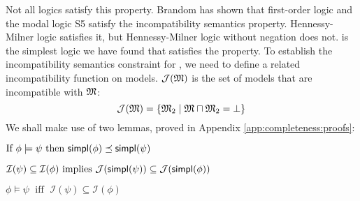 \NI Not all logics satisfy this property.  Brandom has shown that
first-order logic and the modal logic S5 satisfy the incompatibility
semantics property.
Hennessy-Milner logic satisfies it, but Hennessy-Milner logic without
negation does not.  \Cathoristic{} is the simplest logic we have found
that satisfies the property.  To establish the incompatibility
semantics constraint for \cathoristic, we need to define a related
incompatibility function on models.  $\mathcal{J}(\frak{M})$ is the set of
models that are incompatible with $\frak{M}$:
\[
\mathcal{J}(\frak{M}) = \{ \frak{M}_2 \; | \; \frak{M} \sqcap \frak{M}_2 = \bot \}
\]
We shall make use of two lemmas, proved in Appendix
\ref{app:completeness:proofs}:
\begin{lemma}
\label{inc1}
$\mbox{If }\phi \models \psi \mbox{ then } \mathsf{simpl}(\phi) \preceq \mathsf{simpl}(\psi)$
\end{lemma}
\begin{lemma}
\label{inc3}
$\mathcal{I}(\psi) \subseteq \mathcal{I}(\phi) \mbox{ implies } \mathcal{J}(\mathsf{simpl}(\psi)) \subseteq \mathcal{J}(\mathsf{simpl}(\phi))$
\end{lemma}

\begin{theorem}
\label{incompatibilitytheorem}
$\phi \models \psi \; \mbox{ iff } \; \mathcal{I}(\psi) \subseteq \mathcal{I}(\phi)$
\end{theorem}

